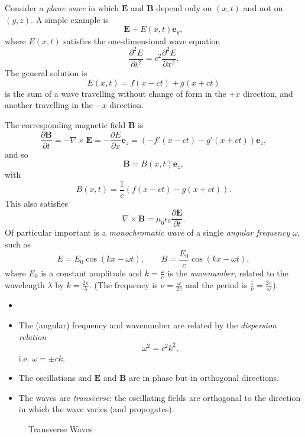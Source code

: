 \documentclass[12pt]{article}
\begin{document}
Consider a \emph{plane wave} in which $\mathbf{E}$ and $\mathbf{B}$ depend only on $(x, t)$ and not on $(y, z)$. A simple example is
\[
\mathbf{E} + E(x, t) \mathbf{e}_y,
\]
where $E(x, t)$ satisfies the one-dimensional wave equation
\[
\frac{\partial^2 E}{\partial t^2} = c^2 \frac{\partial^2 E}{\partial x^2}.
\]
The general solution is
\[
E(x, t) = f(x - ct) + g(x + ct)
\]
is the sum of a wave travelling without change of form in the $+x$ direction, and another travelling in the $-x$ direction.

The corresponding magnetic field $\mathbf{B}$ is
\[
\frac{\partial \mathbf{B}}{\partial t} = - \nabla \times \mathbf{E} = - \frac{\partial E}{\partial x} \mathbf{e}_z = (-f'(x - ct) - g'(x+ct))\mathbf{e}_z,
\]
and so
\[
\mathbf{B} = B(x, t) \mathbf{e}_z,
\]
with
\[
B(x, t) = \frac{1}{c} (f(x - ct) - g(x + ct)).
\]
This also satisfies
\[
\nabla \times \mathbf{B} = \mu_0 \epsilon_0 \frac{\partial \mathbf{E}}{\partial t}.
\]
Of particular important is a \emph{monochromatic wave} of a single \emph{angular frequency} $\omega$, such as
\[
E = E_0 \cos(kx - \omega t), \qquad B = \frac{E_0}{c} \cos(kx - \omega t),
\]
where $E_0$ is a constant amplitude and $k = \frac{\omega}{c}$ is the \emph{wavenumber}, related to the wavelength $\lambda$ by $k = \frac{2\pi}{\lambda}$. (The frequency is $\nu = \frac{\omega}{2 \pi}$ and the period is $\frac{1}{\nu} = \frac{2\pi}{\omega}$).

\begin{remark}
	\begin{itemize}
		\item[]
		\item The (angular) frequency and wavenumber are related by the \emph{dispersion relation}
			\[
			\omega^2 = c^2 k^2,
			\]
			i.e. $\omega = \pm ck$.
		\item The oscillations and $\mathbf{E}$ and $\mathbf{B}$ are in phase but in orthogonal directions.
		\item The waves are \emph{transverse}: the oscillating fields are orthogonal to the direction in which the wave varies (and propogates).
	\end{itemize}
	
\end{remark}

\begin{figure}[h]
	\centering
	\caption{Transverse Waves}
	\label{fig:transverse_waves}
\end{figure}
\end{document}
